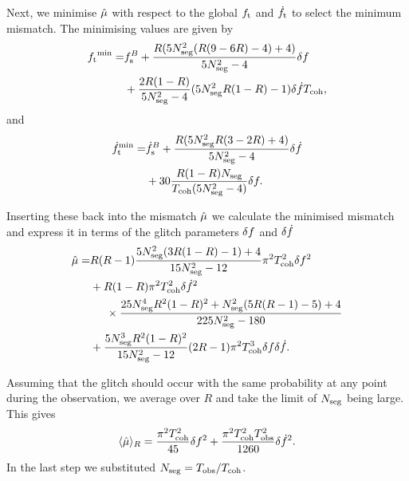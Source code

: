 \documentclass[../full_thesis/full_thesis.tex]{subfiles}
\begin{document}
Next, we minimise $\hat{\mu}$ with respect to the global ${f_{\textrm{t}}}$ and $\dot{f}_{\textrm{t}}$ to
select the minimum mismatch. The minimising values are given by
\begin{align}
\begin{split}
{f_{\textrm{t}}}^{\textrm{min}}  = & f_{\textrm{s}}^{B}
+ \frac{R(5N_{\textrm{seg}}^{2}(R(9-6R)-4) + 4)}{5N_{\textrm{seg}}^{2}-4}\delta f \\
& + \frac{2R(1-R)}{5N_{\textrm{seg}}^{2}-4}(5N_{\textrm{seg}}^{2}R(1-R)-1)\delta\dot{f}T_{\mathrm{coh}},
\end{split}
\end{align}
and
\begin{align}
\begin{split}
\dot{f}_{\textrm{t}}^{\textrm{min}} = & \dot{f}_{\textrm{s}}^{B}
+ \frac{R(5N_{\textrm{seg}}^{2}R(3-2R)+ 4)}{5N_{\textrm{seg}}^{2}-4}\delta\dot{f} \\
& + 30\frac{R(1-R)N_{\textrm{seg}}}{T_{\mathrm{coh}}(5N_{\textrm{seg}}^{2} - 4)}\delta f.
\end{split}
\end{align}

Inserting these back into the mismatch $\hat{\mu}$ we calculate the minimised
mismatch and express it in terms of the glitch parameters $\delta f$ and
$\delta\dot{f}$
\begin{align}
\begin{split}
\hat{\mu} = & R(R-1)\frac{5N_{\textrm{seg}}^{2}(3R(1-R)-1) + 4}{15N_{\textrm{seg}}^{2}-12}\pi^{2}
            T_{\mathrm{coh}}^{2}\delta f^{2} \\
& + R(1-R)\pi^{2}T_{\mathrm{coh}}^{2}\delta\dot{f}^{2} \\
& \hspace{5mm}\times\frac{25N_{\textrm{seg}}^{4}R^{2}(1-R)^{2} + N_{\textrm{seg}}^{2}(5R(R-1)-5) + 4}{225N_{\textrm{seg}}^{2}-180} \\
& + \frac{5N_{\textrm{seg}}^{3}R^{2}(1-R)^{2}}{15N_{\textrm{seg}}^{2}-12}(2R-1)
   \pi^{2}T_{\mathrm{coh}}^{3}\delta f\delta\dot{f}.
\end{split}
\label{eqn: mu semi-coherent R}
\end{align}

Assuming that the glitch should occur with the same probability at any point
during the observation, we average over $R$ and take the limit of $N_{\textrm{seg}}$ being
large. This gives
\begin{align}
\langle\hat{\mu}\rangle_{R} = \frac{\pi^{2}T_{\mathrm{coh}}^{2}}{45}\delta f^{2}
      + \frac{\pi^{2}T_{\mathrm{coh}}^{2}T_{\mathrm{obs}}^{2}}{1260}\delta\dot{f}^{2}.
\label{eqn: R-averaged semi coherent}
\end{align}
In the last step we substituted $N_{\textrm{seg}}=T_{\mathrm{obs}}/T_{\mathrm{coh}}$.
\end{document}
